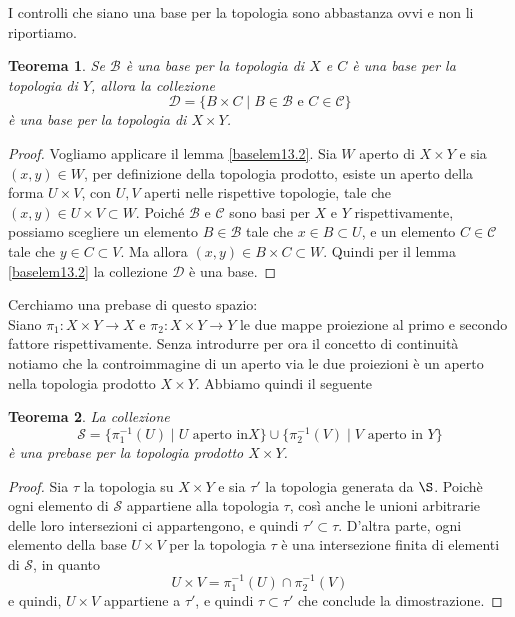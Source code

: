 \documentclass[10pt,a4paper]{article}
\theoremstyle{definition}
\theoremstyle{plain}
\newtheorem{teo}{Teorema}
\theoremstyle{remark}
\theoremstyle{remark}
\newcommand{\C}{\mathcal{C}}
\newcommand{\B}{\mathcal{B}}
\newcommand{\D}{\mathcal{D}}
\newcommand{\Ss}{\mathcal{S}}
\begin{document}
I controlli che siano una base per la topologia sono abbastanza ovvi e non li
riportiamo. \\
\begin{teo} Se $\B$ è una base per la topologia di $X$ e $C$ è una base per la
topologia di $Y$, allora la collezione \[ \D = \lbrace B \times C \mid B \in \B
\text{ e } C \in \C \rbrace \] è una base per la topologia di $X \times Y$.
\end{teo}
\begin{proof} Vogliamo applicare il lemma \ref{baselem13.2}. Sia $W$ aperto di
$X \times Y$ e sia $(x,y) \in W$, per definizione della topologia prodotto,
esiste un aperto della forma $U \times V$, con $U,V$ aperti nelle rispettive
topologie, tale che $(x,y) \in U \times V \subset W$. Poiché $\B$ e $\C$ sono
basi per $X$ e $Y$ rispettivamente, possiamo scegliere un elemento $B \in \B$
tale che $x \in B \subset U$, e un elemento $C \in \C$ tale che $y \in C \subset
V$. Ma allora $(x,y) \in B \times C \subset W$. Quindi per il lemma
\ref{baselem13.2} la collezione $\D$ è una base.
\end{proof}

Cerchiamo una prebase di questo spazio:\\ Siano $\pi_1 : X \times Y \to X$ e
$\pi_2 : X \times Y \to Y$ le due mappe proiezione al primo e secondo fattore
rispettivamente. Senza introdurre per ora il concetto di continuità notiamo che
la controimmagine di un aperto via le due proiezioni è un aperto nella topologia
prodotto $X \times Y$. Abbiamo quindi il seguente

\begin{teo} La collezione \[ \Ss = \lbrace \pi_1^{-1}(U) \mid U \text{ aperto in
} X \rbrace \cup \lbrace \pi_2^{-1}(V)\mid V \text{ aperto in } Y \rbrace \] è
una prebase per la topologia prodotto $X \times Y$.
\end{teo}

\begin{proof}


Sia $\tau$ la topologia su $X \times Y$ e sia $\tau'$ la topologia generata da
$\S$. Poichè ogni elemento di $\Ss$ appartiene alla topologia $\tau$, così anche
le unioni arbitrarie delle loro intersezioni ci appartengono, e quindi $\tau'
\subset \tau$. D'altra parte, ogni elemento della base $U \times V$ per la
topologia $\tau$ è una intersezione finita di elementi di $\Ss$, in quanto \[ U
\times V = \pi_1^{-1}(U) \cap \pi_2^{-1}(V) \] e quindi, $U \times V$ appartiene
a $\tau'$, e quindi $\tau \subset \tau'$ che conclude la dimostrazione.
\end{proof}
\end{document}
